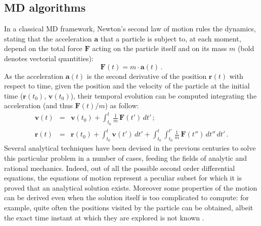 \subsection{MD algorithms}
In a classical MD framework, Newton's second law of motion rules the dynamics, stating that the acceleration $\textbf{a}$ that a particle is subject to, at each moment, depend on the total force $\textbf{F}$ acting on the particle itself and on its mass $m$ (bold denotes vectorial quantities):
\begin{equation}
\textbf{F}(t) =  m \cdot \textbf{a}(t) \, .
\end{equation}
As the acceleration $\textbf{a}(t)$ is the second derivative of the position $\textbf{r}(t)$ with respect to time, given the position and the velocity of the particle at the initial time ($\textbf{r}(t_0)$, $\textbf{v}(t_0)$), their temporal evolution can be computed integrating the acceleration (and thus $\textbf{F}(t)/m$) as follow:
\begin{eqnarray} \label{eq:analytical}
\mathbf{v}(t) &=& \mathbf{v}(t_0) + \int_{t_0}^t \frac{1}{m}\,\mathbf{F}(t') \, dt' \, ; \\
\mathbf{r}(t) &=& \mathbf{r}(t_0) + \int_{t_0}^t \mathbf{v}(t') \, dt' + \int_{t_0}^t \int_{t_0}^{t'} \frac{1}{m}\,\mathbf{F}(t'') \, dt'' \, dt'\, .
\end{eqnarray}
Several analytical techniques have been devised in the previous centuries to solve this particular problem in a number of cases, feeding the fields of analytic and rational mechanics. Indeed, out of all the possible second order differential equations, the equations of motion represent a peculiar subset for which it is proved that an analytical solution exists. Moreover some properties of the motion can be derived even when the solution itself is too complicated to compute: for example, quite often the positions visited by the particle can be obtained, albeit the exact time instant at which they are explored is not known \cite{Arnold}.

